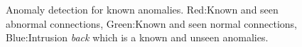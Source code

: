 \begin{figure}[htb2]
\begin{center}
\end{center}
\caption{Anomaly detection for known anomalies. Red:Known and seen abnormal connections, Green:Known and seen normal connections, Blue:Intrusion \textit{back} which is a known and unseen anomalies.} %
\label{fig:refSingleRobot1}

\end{figure}
